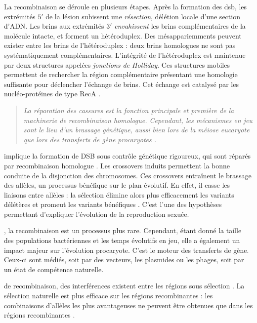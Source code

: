 \documentclass[11pt, oneside]{scrartcl}
\begin{document}
La recombinaison se déroule en plusieurs étapes. Après la formation des
\ac{dsb}, les extrémités \(5'\) de la lésion subissent une \emph{résection}, délétion
locale d'une section d'ADN. Les brins aux extrémités \(3'\) \emph{envahissent} les
brins complémentaires de la molécule intacte, et forment un hétéroduplex. Des
mésappariemments peuvent exister entre les brins de l'hétéroduplex : deux brins
homologues ne sont pas systématiquement complémentaires. L'intégrité de
l'hétéroduplex est maintenue par deux structures appelées \emph{jonctions de
Holliday}. Ces structures mobiles permettent de rechercher la région
complémentaire présentant une homologie suffisante pour déclencher l'échange de
brins. Cet échange est catalysé par les nucléo-protéines de type
RecA \cite{lusetti_bacterial_2002}. 

\begin{quote}
{\em 
  La réparation des cassures est la fonction principale et \emph{première} de la
  machinerie de recombinaison homologue. Cependant, les mécanismes en jeu sont le
  lieu d'un brassage génétique, aussi bien lors de la méiose eucaryote que lors
  des transferts de gène procaryotes \cite{redfield_bacteria_2001}.
}
\end{quote}

 implique la formation de DSB sous contrôle
génétique rigoureux, qui sont réparés par recombinaison homologue
\cite{chapman_playing_2012}. Les crossovers induits permettent la bonne conduite
de la disjonction des chromosomes. Ces crossovers entraînent le brassage des
allèles, un processus bénéfique sur le plan évolutif\cite{webster_direct_2012}.
En effet, il casse les liaisons entre allèles : la sélection élimine alors plus
efficacement les variants délétères et promeut les variants bénéfiques
\cite{otto_resolving_2002}. C'est l'une des hypothèses permettant d'expliquer
l'évolution de la reproduction sexuée\cite{otto_why_2006}.

, la recombinaison est un processus plus rare.
Cependant, étant donné la taille des populations bactériennes et les temps
évolutifs en jeu, elle a également un impact majeur sur l'évolution
procaryote\cite{didelot_impact_2010}. C'est le moteur des transferts de gène.
Ceux-ci sont médiés, soit par des vecteurs, les plasmides ou les phages, soit
par un état de compétence naturelle.

 de recombinaison, des interférences existent entre les
régions sous sélection \cite{hill_effect_1966}. La sélection naturelle est plus
efficace sur les régions recombinantes : les combinaisons d'allèles les plus
avantageuses ne peuvent être obtenues que dans les régions recombinantes
\cite{hurst_genetics_2009}.
\end{document}
